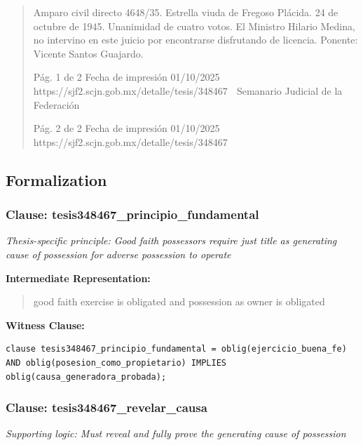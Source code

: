 \documentclass[11pt,a4paper]{article}
\begin{document}
\begin{quote}
Amparo civil directo 4648/35. Estrella viuda de Fregoso Plácida. 24 de octubre de 1945. Unanimidad
de cuatro votos. El Ministro Hilario Medina, no intervino en este juicio por encontrarse disfrutando de
licencia. Ponente: Vicente Santos Guajardo.




                                              Pág. 1 de 2             Fecha de impresión 01/10/2025
  https://sjf2.scjn.gob.mx/detalle/tesis/348467
                                                Semanario Judicial de la Federación




                                           Pág. 2 de 2       Fecha de impresión 01/10/2025
https://sjf2.scjn.gob.mx/detalle/tesis/348467

\end{quote}

\subsection{Formalization}

\subsubsection{Clause: tesis348467\_principio\_fundamental}

\textit{Thesis-specific principle: Good faith possessors require just title as generating cause of possession for adverse possession to operate}

\textbf{Intermediate Representation:}

\begin{quote}
good faith exercise is obligated and possession as owner is obligated
\end{quote}

\textbf{Witness Clause:}

\begin{lstlisting}[style=witnessstyle, language=Witness]
clause tesis348467_principio_fundamental = oblig(ejercicio_buena_fe) AND oblig(posesion_como_propietario) IMPLIES oblig(causa_generadora_probada);
\end{lstlisting}

\subsubsection{Clause: tesis348467\_revelar\_causa}

\textit{Supporting logic: Must reveal and fully prove the generating cause of possession}
\end{document}
